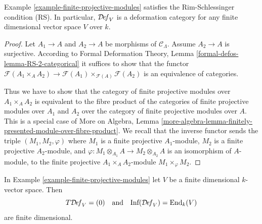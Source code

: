 \begin{lemma}
\label{lemma-finite-projective-modules-RS}
Example \ref{example-finite-projective-modules}
satisfies the Rim-Schlessinger condition (RS).
In particular, $\mathcal{D}\!\mathit{ef}_V$ is a deformation category
for any finite dimensional vector space $V$ over $k$.
\end{lemma}

\begin{proof}
Let $A_1 \to A$ and $A_2 \to A$ be morphisms of $\mathcal{C}_\Lambda$.
Assume $A_2 \to A$ is surjective. According to
Formal Deformation Theory, Lemma
\ref{formal-defos-lemma-RS-2-categorical}
it suffices to show that the functor
$\mathcal{F}(A_1 \times_A A_2) \to
\mathcal{F}(A_1) \times_{\mathcal{F}(A)} \mathcal{F}(A_2)$
is an equivalence of categories.

\medskip\noindent
Thus we have to show that the category of finite projective modules
over $A_1 \times_A A_2$ is equivalent to the fibre product
of the categories of finite projective modules over $A_1$ and $A_2$
over the category of finite projective modules over $A$.
This is a special case of More on Algebra, Lemma
\ref{more-algebra-lemma-finitely-presented-module-over-fibre-product}.
We recall that the inverse functor sends the triple
$(M_1, M_2, \varphi)$ where
$M_1$ is a finite projective $A_1$-module,
$M_2$ is a finite projective $A_2$-module, and
$\varphi : M_1 \otimes_{A_1} A \to M_2 \otimes_{A_2} A$
is an isomorphism of $A$-module, to the finite projective
$A_1 \times_A A_2$-module $M_1 \times_\varphi M_2$.
\end{proof}

\begin{lemma}
\label{lemma-finite-projective-modules-TI}
In Example \ref{example-finite-projective-modules}
let $V$ be a finite dimensional $k$-vector space. Then
$$
T\mathcal{D}\!\mathit{ef}_V = (0)
\quad\text{and}\quad
\text{Inf}(\mathcal{D}\!\mathit{ef}_V) = \text{End}_k(V)
$$
are finite dimensional.
\end{lemma}

